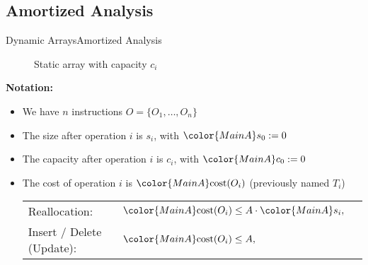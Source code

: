 
\subsection{Amortized Analysis}

\begin{frame}{Dynamic Arrays}{Amortized Analysis}
  \vspace*{-1.0em}
  \begin{figure}[!t]%
    \def\FSAsize{16}\def\FSAelements{11}%
    \def\FSAcopy{0}\def\FSAdelete{0}\def\FSAinsert{0}%
    \def \FSAcopyarrow{1}%
    \def\FSAlabelsize{Size ${\color{MainA}s_i}$}%
    \def\FSAlabelcapacity{Capacity ${\color{MainA}c_i}$}%
    \vspace*{-0.5em}%
    \caption{Static array with capacity $c_i$}%
    \label{fig:array_amortized analysis}%
  \end{figure}%
  \vspace*{-1.0em}
  \textbf{Notation:}%
  \begin{itemize}%
    \item
      We have $n$ instructions $O = \{O_1,\dots,O_n\}$
    \item
      The {\color{MainA}size} after operation $i$ is
      {\color{MainA}$s_i$},
      with ${\color{MainA}s_0} := 0$
    \item
      The {\color{MainA}capacity} after operation $i$ is
      {\color{MainA}$c_i$},
      with ${\color{MainA}c_0} := 0$
    \item
      The {\color{MainA}cost} of operation $i$ is
      ${\color{MainA}\mathrm{cost}(O_i)}$
      (previously named $T_i$)\\[0.5em]
      \begin{tabular}{lll}
        Reallocation: &
        ${\color{MainA}\mathrm{cost}(O_i)}
          \leq A \cdot {\color{MainA}s_i},$ & {}\\
        Insert / Delete (Update): &
        ${\color{MainA}\mathrm{cost}(O_i)}
          \leq A,$ & {}
      \end{tabular}
  \end{itemize}
\end{frame}


